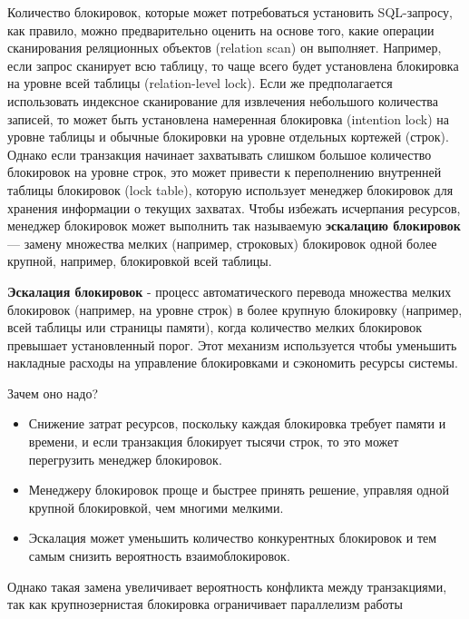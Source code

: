 Количество блокировок, которые может потребоваться установить SQL-запросу, как правило, можно предварительно оценить на основе того, какие операции сканирования реляционных объектов (relation scan) он выполняет. Например, если запрос сканирует всю таблицу, то чаще всего будет установлена блокировка на уровне всей таблицы (relation-level lock). Если же предполагается использовать индексное сканирование для извлечения небольшого количества записей, то может быть установлена намеренная блокировка (intention lock) на уровне таблицы и обычные блокировки на уровне отдельных кортежей (строк). Однако если транзакция начинает захватывать слишком большое количество блокировок на уровне строк, это может привести к переполнению внутренней таблицы блокировок (lock table), которую использует менеджер блокировок для хранения информации о текущих захватах. Чтобы избежать исчерпания ресурсов, менеджер блокировок может выполнить так называемую \textbf{эскалацию блокировок} — замену множества мелких (например, строковых) блокировок одной более крупной, например, блокировкой всей таблицы. \autocites[ch.18]{Silberschatz}

\begin{grayquote}
    \textbf{Эскалация блокировок} - процесс автоматического перевода множества мелких блокировок (например, на уровне строк) в более крупную блокировку (например, всей таблицы или страницы памяти), когда количество мелких блокировок превышает установленный порог. Этот механизм используется чтобы уменьшить накладные расходы на управление блокировками и сэкономить ресурсы системы.
\end{grayquote}

Зачем оно надо?
\begin{itemize}
    \item Снижение затрат ресурсов, поскольку каждая блокировка требует памяти и времени, и если транзакция блокирует тысячи строк, то это может перегрузить менеджер блокировок.
    \item Менеджеру блокировок проще и быстрее принять решение, управляя одной крупной блокировкой, чем многими мелкими.
    \item Эскалация может уменьшить количество конкурентных блокировок и тем самым снизить вероятность взаимоблокировок.
\end{itemize}

Однако такая замена увеличивает вероятность конфликта между транзакциями, так как крупнозернистая блокировка ограничивает параллелизм работы \autocite{MicrosoftLearnSQLserverTransLock}

